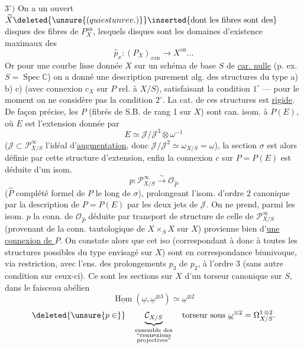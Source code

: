 $3^\circ)$ On a un ouvert $\widetilde X\deleted{\unsure{(qui est un rev.)}}\inserted{\text{dont les fibres sont des}}$ disques des fibres de $P_X^{\mathrm{an}}$, lesquels disques sont les domaines d'existence maximaux des
\[\widehat p_x:(P_X)_{x\mathrm{an}}\longrightarrow X^{\mathrm{an}}\ldots\]
Or pour une courbe lisse donnée $X$ sur un schéma de base $S$ de \uline{car. nulle} (p. ex. $S=\operatorname{Spec}\mathbb C$) on a donné une description purement alg. des structures du type a) b) c) (avec connexion $c_X$ sur $P$ rel. à $X/S$), satisfaisant la condition $1^\circ$ --- pour le moment on ne considère pas la condition $2^\circ$. La cat. de ces structures est \uline{rigide}.
De façon précise, les $P$ (fibrés de S.B. de rang 1 sur $X$) sont can. isom. à $P(E)$, où $E$ est l'extension
donnée par
\[E\simeq\mathcal J/\mathcal J^3\otimes\omega^{-1}\]
($\mathcal J\subset\mathcal P^\infty_{X/S}$ l'idéal d'\uline{augmentation}, donc $\mathcal J/\mathcal J^2\simeq\omega_{X/S}=\omega$), la section $\sigma$ est alors définie par cette structure d'extension, enfin la connexion $c$ sur $P=P(E)$ est déduite d'un isom.
\[p:\mathcal P^\infty_{X/S}\xrightarrow{\sim}\mathcal O_{\widehat P}\]
($\widehat P$ complété formel de $P$ le long de $\sigma$), prolongeant l'isom. d'ordre 2 canonique   par la description de $P=P(E)$ par les deux  jets de $\mathcal J$. On ne prend, parmi les isom. $p$  la conn. de $\mathcal O_{\widehat P}$ déduite par transport de structure de celle de $\mathcal P^\infty_{X/S}$ (provenant de la conn. tautologique de $X\times_S X$ sur $X$) provienne bien d'\uline{une connexion de $P$}. On constate alors que cet iso (correspondant à
donc à toutes les structures possibles du type envisagé sur $X$) sont en correspondance biunivoque, via restriction, avec l'ens. des prolongements $p_3$ de $p_2$, à l'ordre 3 (sans autre condition sur ceux-ci).
Ce sont  les sections sur $X$ d'un torseur canonique sur $S$, dans le faisceau abélien
\[\underline{\operatorname{Hom}}(\underline\omega,\underline\omega^{\otimes3})\simeq\underline\omega^{\otimes2}\]
\[
\deleted{\unsure{p\in}}\quad\underbrace{\mathcal C_{X/S}}_{\substack{\text{ensemble des}\\\text{``connexions}\\\text{projectives''}}}\quad\text{torseur sous }\underline\omega^{\otimes2}=\Omega^{1\,\otimes2}_{X/S}.
\]
